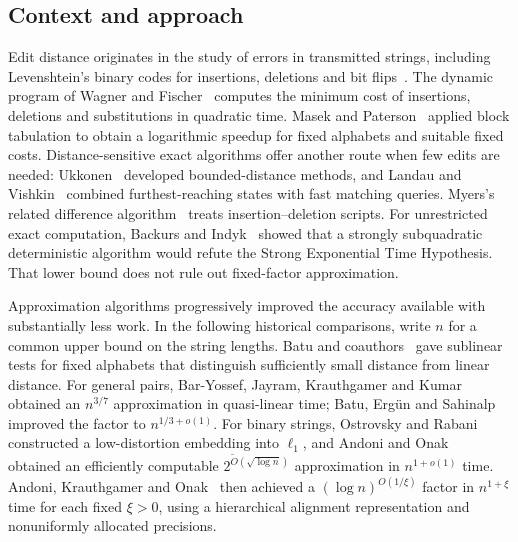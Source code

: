 \subsection{Context and approach}
Edit distance originates in the study of errors in transmitted strings,
including Levenshtein's binary codes for insertions, deletions and bit
flips~\cite{Levenshtein1966}. The dynamic program of Wagner and
Fischer~\cite{WagnerFischer1974} computes the minimum cost of insertions,
deletions and substitutions in quadratic time. Masek and
Paterson~\cite{MasekPaterson1980} applied block tabulation to obtain a
logarithmic speedup for fixed alphabets and suitable fixed costs.
Distance-sensitive exact algorithms offer another route when few edits
are needed: Ukkonen~\cite{Ukkonen1985} developed bounded-distance methods,
and Landau and Vishkin~\cite{LandauVishkin1988,LandauVishkin1989} combined
furthest-reaching states with fast matching queries. Myers's related
difference algorithm~\cite{Myers1986} treats insertion--deletion scripts.
For unrestricted exact computation, Backurs and
Indyk~\cite{BackursIndyk2018} showed that a strongly subquadratic
deterministic algorithm
would refute the Strong Exponential Time Hypothesis. That lower bound
does not rule out fixed-factor approximation.

Approximation algorithms progressively improved the accuracy available
with substantially less work. In the following historical comparisons,
write $n$ for a common upper bound on the string lengths.
Batu and coauthors~\cite{BatuEtAl2003}
gave sublinear tests for fixed alphabets that distinguish sufficiently
small distance from linear distance. For general pairs, Bar-Yossef, Jayram, Krauthgamer and
Kumar~\cite{BarYossefEtAl2004} obtained an $n^{3/7}$ approximation in
quasi-linear time; Batu, Erg\"un and
Sahinalp~\cite{BatuErgunSahinalp2006} improved the factor to
$n^{1/3+o(1)}$. For binary strings, Ostrovsky and
Rabani~\cite{OstrovskyRabani2007}
constructed a low-distortion embedding into $\ell_1$, and Andoni and
Onak~\cite{AndoniOnak2012} obtained an efficiently computable
$2^{\widetilde O(\sqrt{\log n})}$ approximation in $n^{1+o(1)}$ time.
Andoni, Krauthgamer and Onak~\cite{AndoniKrauthgamerOnak2010} then
achieved a $(\log n)^{O(1/\xi)}$ factor in $n^{1+\xi}$ time for each
fixed $\xi>0$, using a hierarchical alignment representation and
nonuniformly allocated precisions.

